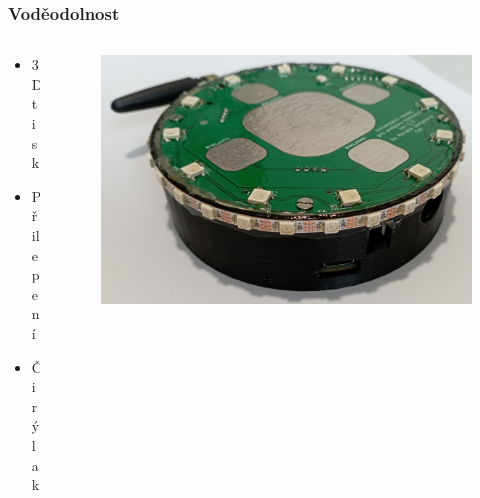 \documentclass[%
  12pt,       				%
	t,                  %
	aspectratio=1610,   %
	unicode,						%
]{beamer}				    	%
\begin{document}
\begin{frame}
	\frametitle{Voděodolnost}
	\begin{columns}[T] 	
		\begin{column}{0.3\textwidth}	
			\begin{itemize}
				\item 3D tisk  
				\item Přilepení 
				\item Čirý lak
			\end{itemize}
		\end{column}

		\begin{column}{0.7\textwidth}	
			\begin{figure}%
				\centering	          
				\includegraphics[width=1\columnwidth]{obrazky/v_krabicce_bok.jpg}
			\end{figure}
		\end{column}
	\end{columns}
\end{frame}
\end{document}
